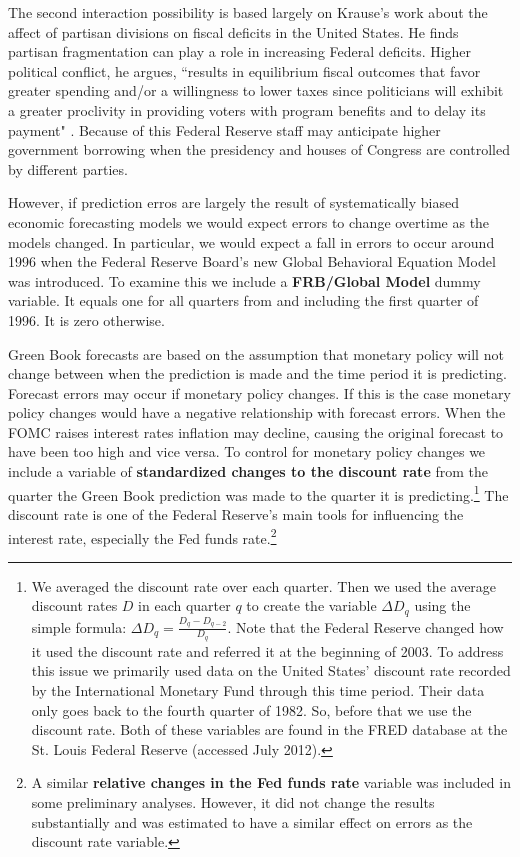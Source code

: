 \documentclass[a4paper]{article}
\begin{document}
The second interaction possibility is based largely on Krause's \citeyearpar{Krause2000} work about the affect of partisan divisions on fiscal deficits in the United States. He finds partisan fragmentation can play a role in increasing Federal deficits. Higher political conflict, he argues, ``results in equilibrium fiscal outcomes that favor greater spending and/or a willingness to lower taxes since politicians will exhibit a greater proclivity in providing voters with program benefits and to delay its payment" \citep[][542]{Krause2000}. Because of this Federal Reserve staff may anticipate higher government borrowing when the presidency and houses of Congress are controlled by different parties. 

However, if prediction erros are largely the result of systematically biased economic forecasting models we would expect errors to change overtime as the models changed. In particular, we would expect a fall in errors to occur around 1996 when the Federal Reserve Board's new Global Behavioral Equation Model was introduced. To examine this we include a {\bf{FRB/Global Model}} dummy variable. It equals one for all quarters from and including the first quarter of 1996. It is zero otherwise.

Green Book forecasts are based on the assumption that monetary policy will not change between when the prediction is made and the time period it is predicting. Forecast errors may occur if monetary policy changes. If this is the case monetary policy changes would have a negative relationship with forecast errors. When the FOMC raises interest rates inflation may decline, causing the original forecast to have been too high and vice versa. To control for monetary policy changes we include a variable of {\bf{standardized changes to the discount rate}} from the quarter the Green Book prediction was made to the quarter it is predicting.\footnote{We averaged the discount rate over each quarter. Then we used the average discount rates $D$ in each quarter $q$ to create the variable $\Delta D_{q}$ using the simple formula: $\Delta D_{q} = \frac{D_{q} - D_{q-2}}{D_{q}}$. Note that the Federal Reserve changed how it used the discount rate and referred it at the beginning of 2003. To address this issue we primarily used data on the United States' discount rate recorded by the International Monetary Fund through this time period. Their data only goes back to the fourth quarter of 1982. So, before that we use the discount rate. Both of these variables are found in the FRED database at the St. Louis Federal Reserve (accessed July 2012). } The discount rate is one of the Federal Reserve's main tools for influencing the interest rate, especially the Fed funds rate.\footnote{A similar {\bf{relative changes in the Fed funds rate}} variable was included in some preliminary analyses. However, it did not change the results substantially and was estimated to have a similar effect on errors as the discount rate variable.}
\end{document}
